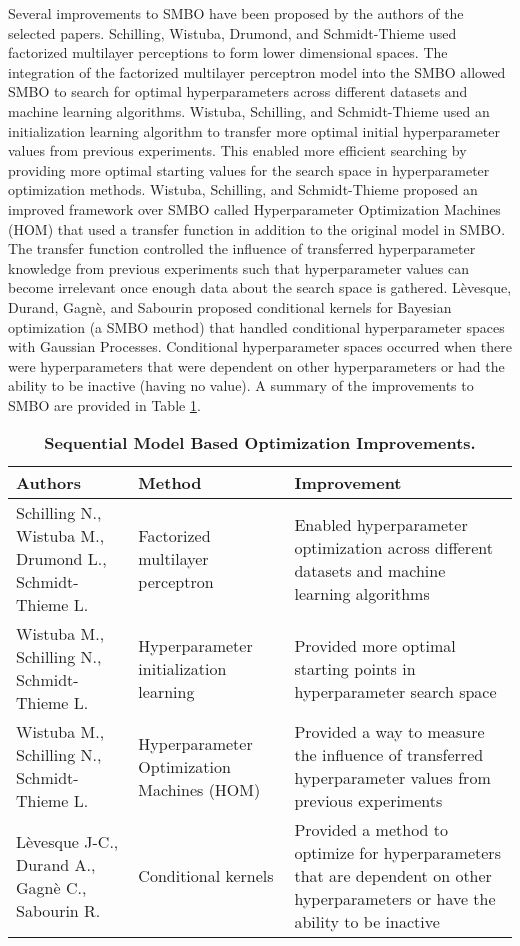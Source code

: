 Several improvements to SMBO have been proposed by the authors of the selected papers. Schilling, Wistuba, Drumond, and Schmidt-Thieme \cite{Schilling:2015} used factorized multilayer perceptions to form lower dimensional spaces. The integration of the factorized multilayer perceptron model into the SMBO allowed SMBO to search for optimal hyperparameters across different datasets and machine learning algorithms. Wistuba, Schilling, and Schmidt-Thieme \cite{Wistuba:2015} used an initialization learning algorithm to transfer more optimal initial hyperparameter values from previous experiments. This enabled more efficient searching by providing more optimal starting values for the search space in hyperparameter optimization methods. Wistuba, Schilling, and Schmidt-Thieme \cite{Wistuba:2016} proposed an improved framework over SMBO called Hyperparameter Optimization Machines (HOM) that used a transfer function in addition to the original model in SMBO. The transfer function controlled the influence of transferred hyperparameter knowledge from previous experiments such that hyperparameter values can become irrelevant once enough data about the search space is gathered. L\`evesque, Durand, Gagn\`e, and Sabourin \cite{Levesque:2017} proposed conditional kernels for Bayesian optimization (a SMBO method) that handled conditional hyperparameter spaces with Gaussian Processes. Conditional hyperparameter spaces occurred when there were hyperparameters that were dependent on other hyperparameters or had the ability to be inactive (having no value). A summary of the improvements to SMBO are provided in Table \ref{table:smbo_improvements}.

\begin{table}
\centering
\caption{\textbf{Sequential Model Based Optimization Improvements.}}
\label{table:smbo_improvements}
\begin{tabular}{p{1in}p{0.7in}p{1.3in}}
	\toprule
	\textbf{Authors} & \textbf{Method} & \textbf{Improvement} \\
	\midrule \addlinespace
	Schilling N., Wistuba M., Drumond L., Schmidt-Thieme L. \cite{Schilling:2015} & Factorized multilayer perceptron & Enabled hyperparameter optimization across different datasets and machine learning algorithms
	\addlinespace\\ 
	\midrule \addlinespace
	Wistuba M., Schilling N., Schmidt-Thieme L. \cite{Wistuba:2015} & Hyperparameter initialization learning & Provided more optimal starting points in hyperparameter search space
	\addlinespace \\
	\midrule \addlinespace
	Wistuba M., Schilling N., Schmidt-Thieme L. \cite{Wistuba:2016} & Hyperparameter Optimization Machines (HOM)  & Provided a way to measure the influence of transferred hyperparameter values from previous experiments
	\addlinespace \\
	\midrule \addlinespace
	L\`evesque J-C., Durand A., Gagn\`e C., Sabourin R. \cite{Levesque:2017}& Conditional kernels & Provided a method to optimize for hyperparameters that are dependent on other hyperparameters or have the ability to be inactive
	\addlinespace \\
	\bottomrule
\end{tabular}
\end{table}



